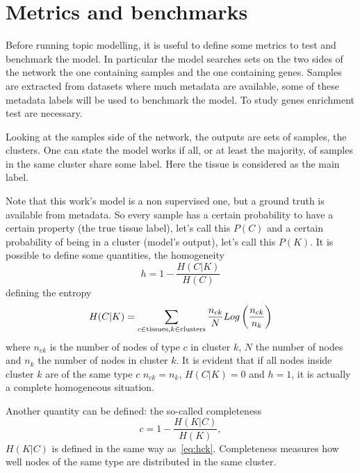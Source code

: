 \section{Metrics and benchmarks}
Before running topic modelling, it is useful to define some metrics to test and benchmark the model. In particular the model searches sets on the two sides of the network the one containing samples and the one containing genes. Samples are extracted from datasets where much metadata are available, some of these metadata labels will be used to benchmark the model. To study genes enrichment test are necessary.

Looking at the samples side of the network, the outputs are sets of samples, the clusters. One can state the model works if all, or at least the majority, of samples in the same cluster share some label. Here the tissue is considered as the main label.

Note that this work's model is a non supervised one, but a ground truth is available from metadata. So every sample has a certain probability to have a certain property (the true tissue label), let's call this $P(C)$ and a certain probability of being in a cluster (model's output), let's call this $P(K)$.
It is possible to define some quantities, the homogeneity
\begin{equation}\label{eq:homogeneity}
    h=1-\frac{H(C|K)}{H(C)}
\end{equation}
defining the entropy
\begin{equation}\label{eq:hck}
    H(C|K)=\sum_{c\in \mathrm{tissues},\\ k \in \mathrm{clusters}}\frac{n_{c k}}{N}Log\left(\frac{n_{c k}}{n_k}\right)
\end{equation}
where $n_{c k}$ is the number of nodes of type $c$ in cluster $k$, $N$ the number of nodes and $n_k$ the number of nodes in cluster $k$. It is evident that if all nodes inside cluster $k$ are of the same type $c$ $n_{c k}=n_{k}$, $H(C|K)=0$ and $h=1$, it is actually a complete homogeneous situation.

Another quantity can be defined: the so-called completeness
\begin{equation}\label{eq:completness}
    c=1-\frac{H(K|C)}{H(K)},
\end{equation}
$H(K|C)$ is defined in the same way as~\ref{eq:hck}. Completeness measures how well nodes of the same type are distributed in the same cluster.

